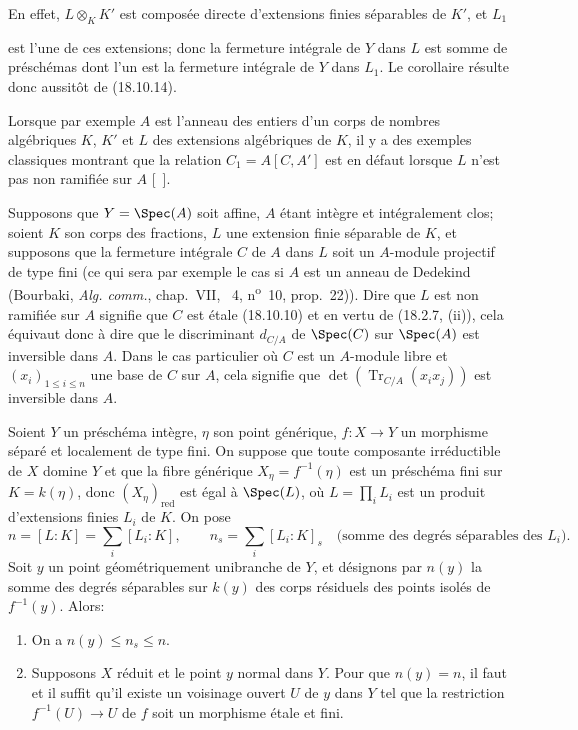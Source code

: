 En effet, $L\otimes_K K'$ est composée directe d'extensions finies séparables de $K'$, et $L_1$


est l'une de ces extensions; donc la fermeture intégrale de $Y$ dans $L$ est somme de préschémas dont l'un est la fermeture intégrale de $Y$ dans $L_1$. Le corollaire résulte donc aussitôt de (18.10.14).

Lorsque par exemple $A$ est l'anneau des entiers d'un corps de nombres algébriques $K$, $K'$ et $L$ des extensions algébriques de $K$, il y a des exemples classiques montrant que la relation $C_1=A[C,A']$ est en défaut lorsque $L$ n'est pas non ramifiée sur $A$ [\ ].

\begin{env}[18.10.15]
\label{IV.18.10.15}
Supposons que $Y=\Spec(A)$ soit affine, $A$ étant intègre et intégralement clos; soient $K$ son corps des fractions, $L$ une extension finie séparable de $K$, et supposons que la fermeture intégrale $C$ de $A$ dans $L$ soit un $A$-module projectif de type fini (ce qui sera par exemple le cas si $A$ est un anneau de Dedekind (Bourbaki, \emph{Alg. comm.}, chap.~VII, \textsection~4, n\textsuperscript{o}~10, prop.~22)). Dire que $L$ est non ramifiée sur $A$ signifie que $C$ est étale (18.10.10) et en vertu de (18.2.7, (ii)), cela équivaut donc à dire que le discriminant $d_{C/A}$ de $\Spec(C)$ sur $\Spec(A)$ est inversible dans $A$. Dans le cas particulier où $C$ est un $A$-module libre et $(x_i)_{1\leq i\leq n}$ une base de $C$ sur $A$, cela signifie que $\det(\operatorname{Tr}_{C/A}(x_ix_j))$ est inversible dans $A$.
\end{env}

\begin{theorem}[18.10.16]
\label{IV.18.10.16}
Soient $Y$ un préschéma intègre, $\eta$ son point générique, $f:X\to Y$ un morphisme séparé et localement de type fini. On suppose que toute composante irréductible de $X$ domine $Y$ et que la fibre générique $X_\eta=f^{-1}(\eta)$ est un préschéma fini sur $K=k(\eta)$, donc $(X_\eta)_{\mathrm{red}}$ est égal à $\Spec(L)$, où $L=\prod_iL_i$ est un produit d'extensions finies $L_i$ de $K$. On pose
\[
  n=[L:K]=\sum_i[L_i:K],\qquad n_s=\sum_i[L_i:K]_s \quad\text{(somme des degrés séparables des $L_i$)}.
\]
Soit $y$ un point géométriquement unibranche de $Y$, et désignons par $n(y)$ la somme des degrés séparables sur $k(y)$ des corps résiduels des points isolés de $f^{-1}(y)$. Alors:
\begin{enumerate}
  \item[(i)] On a $n(y)\leq n_s\leq n$.
  \item[(ii)] Supposons $X$ réduit et le point $y$ normal dans $Y$. Pour que $n(y)=n$, il faut et il suffit qu'il existe un voisinage ouvert $U$ de $y$ dans $Y$ tel que la restriction $f^{-1}(U)\to U$ de $f$ soit un morphisme étale et fini.
\end{enumerate}
\end{theorem}

